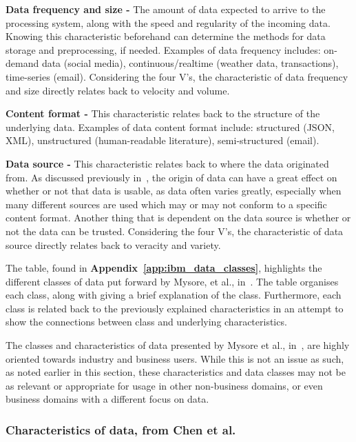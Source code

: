 \documentclass[a4paper,11pt]{article}
\begin{document}
\noindent \textbf{Data frequency and size -} The amount of data expected to arrive to the processing system, along with the speed
and regularity of the incoming data. Knowing this characteristic beforehand can determine the methods for data storage
and preprocessing, if needed. Examples of data frequency includes: on-demand data (social media), continuous/realtime
(weather data, transactions), time-series (email). Considering the four V's, the characteristic of data frequency and
size directly relates back to velocity and volume.

\noindent \textbf{Content format -} This characteristic relates back to the structure of the underlying data. Examples of data
content format include: structured (JSON, XML), unstructured (human-readable literature), semi-structured (email).

\noindent \textbf{Data source -} This characteristic relates back to where the data originated from. As discussed previously
in~, the origin of data can have a great effect on whether or not that data is usable, as data often
varies greatly, especially when many different sources are used which may or may  not conform to a specific content
format. Another thing that is dependent on the data source is whether or not the data can be trusted. Considering the
four V's, the characteristic of data source directly relates back to veracity and variety.

The table, found in \textbf{Appendix~\ref{app:ibm_data_classes}}, highlights the different classes of data put forward
by Mysore, et al., in~\cite{ibm_big_2013}. The table organises each class, along with giving a brief explanation of the
class. Furthermore, each class is related back to the previously explained characteristics in an attempt to show the
connections between class and underlying characteristics.

The classes and characteristics of data presented by Mysore et al., in~\cite{ibm_big_2013}, are highly oriented towards
industry and business users. While this is not an issue as such, as noted earlier in this section, these characteristics
and data classes may not be as relevant or appropriate for usage in other non-business domains, or even business domains
with a different focus on data.



\subsubsection{Characteristics of data, from Chen et al.} %
\label{ssub:characteristics_of_data_from_chen_et_al_}
\end{document}
